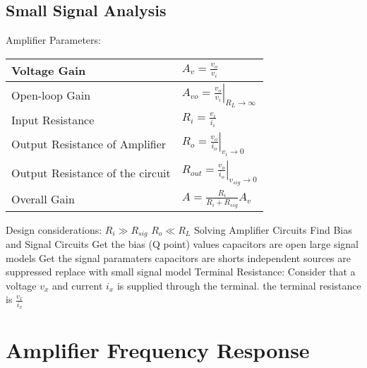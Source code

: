 \documentclass[a4paper,11pt]{article}
\begin{document}
	\subsection{Small Signal Analysis}
	\begin{outline}[enumerate]
		\1 Amplifier Parameters:
			\begin{center}
			\begin{tabular}{|l|l|}
				\hline 
				Voltage Gain & $A_{v} = \frac{v_{o}}{v_{i}}$ \\ \hline 
				Open-loop Gain & $A_{vo} = \left. \frac{v_{o}}{v_{i}} \right|_{R_{L} \to \infty}$ \\ \hline
				Input Resistance & $R_{i} = \frac{v_{i}}{i_{i}}$ \\ \hline
				Output Resistance of Amplifier & $R_{o} = \left. \frac{v_{o}}{i_{o}} \right|_{v_{i} \to 0}$ \\ \hline
				Output Resistance of the circuit & $R_{out} = \left. \frac{v_{o}}{i_{o}} \right|_{v_{sig} \to 0}$ \\ \hline
				Overall Gain & $A = \frac{R_{i}}{R_{i} + R_{sig}}A_{v}$ \\ \hline
			\end{tabular}
			\end{center}
		\1 Design considerations:
			\2 $R_{i} \gg R_{sig}$
			\2 $R_{o} \ll R_{L}$
		\1 Solving Amplifier Circuits
			\2 Find Bias and Signal Circuits
			\2 Get the bias (Q point) values	
				\3 capacitors are open
				\3 large signal models
			\2 Get the signal paramaters	
				\3 capacitors are shorts
				\3 independent sources are suppressed
				\3 replace with small signal model	
			\2 Terminal Resistance:
				\3 Consider that a voltage $v_{x}$ and current $i_{x}$	is supplied through the terminal. the terminal resistance is $\frac{v_{x}}{i_{x}}$
	\end{outline}
	
	\section{Amplifier Frequency Response}
\end{document}
